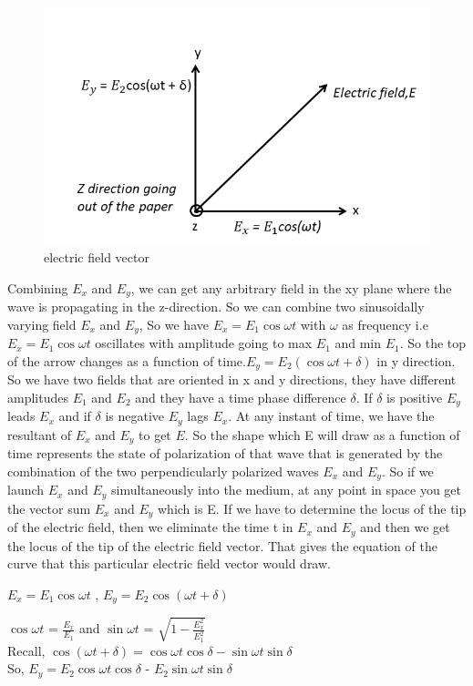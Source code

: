 \begin{figure}[h]
\centering
\includegraphics[width=1\linewidth]{./graphics/E_components}
\caption{electric field vector}
\label{electric field vector components}
\end{figure}
Combining $E_x$ and $E_y$, we can get any arbitrary field in the xy plane where the wave is propagating in the z-direction. So we can combine two sinusoidally varying field $E_x$ and $E_y$, So we have $E_x = E_{1}\cos\omega t$ with $\omega$ as frequency i.e$ E_x = E_{1}\cos\omega t$ oscillates with amplitude going to max $E_{1}$ and min $E_{1}$. So the top of the arrow changes as a function of time.$ E_y = E_{2}(\cos\omega t + \delta)$ in y direction. So we have two fields that are oriented in x and y directions, they have different amplitudes $E_{1}$ and $E_{2}$ and they have a time phase difference $\delta$. If $\delta$ is positive $E_y$ leads $E_x$ and if $\delta$ is negative $E_y$ lags $E_x$. At any instant of time, we have the resultant of $E_x$ and $E_y$ to get $E$. So the shape which E will draw as a function of time represents the state of polarization of that wave that is generated by the combination of the two perpendicularly polarized waves $E_x$ and $E_y$. So if we launch $E_x$ and $E_y$ simultaneously into the medium, at any point in space you get the vector sum $E_x$ and $E_y$ which is E. If we have to determine the locus of the tip of the electric field, then we eliminate the time t in $E_x$ and $E_y$ and then we get the locus of the tip of the electric field vector. That gives the equation of the curve that this particular electric field vector would draw.

$E_x = E_{1}\cos\omega t$ , $E_y = E_{2}\cos(\omega t + \delta)$

$\cos\omega t$ = $\frac{E_x}{E_1}$ and $\sin\omega t$ = $\sqrt{1 - \frac{E_x^2}{E_{1}^2}}$
\\
Recall, $\cos(\omega t + \delta) = \cos\omega t\cos\delta - \sin\omega t\sin\delta$
\\
So,
$E_y = E_{2}\cos\omega t\cos\delta$ - $E_{2}\sin\omega t\sin\delta$

